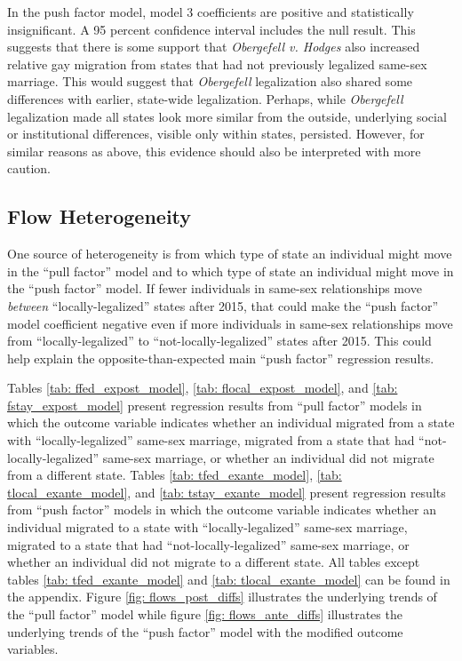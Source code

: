 \documentclass[12pt,letterpaper]{article}
\begin{document}
In the push factor model, model 3 coefficients are positive and statistically insignificant. A 95 percent confidence interval includes the null result. This suggests that there is some support that \textit{Obergefell v. Hodges} also increased relative gay migration from states that had not previously legalized same-sex marriage. This would suggest that \textit{Obergefell} legalization also shared some differences with earlier, state-wide legalization. Perhaps, while \textit{Obergefell} legalization made all states look more similar from the outside, underlying social or institutional differences, visible only within states, persisted. However, for similar reasons as above, this evidence should also be interpreted with more caution.


\clearpage
\subsection{Flow Heterogeneity}

One source of heterogeneity is from which type of state an individual might move in the “pull factor” model and to which type of state an individual might move in the “push factor” model. If fewer individuals in same-sex relationships move \textit{between} “locally-legalized” states after 2015, that could make the “push factor” model coefficient negative even if more individuals in same-sex relationships move from “locally-legalized” to “not-locally-legalized” states after 2015. This could help explain the opposite-than-expected main “push factor” regression results.

Tables \ref{tab: ffed_expost_model}, \ref{tab: flocal_expost_model}, and \ref{tab: fstay_expost_model} present regression results from “pull factor” models in which the outcome variable indicates whether an individual migrated from a state with “locally-legalized” same-sex marriage, migrated from a state that had “not-locally-legalized” same-sex marriage, or whether an individual did not migrate from a different state. Tables \ref{tab: tfed_exante_model}, \ref{tab: tlocal_exante_model}, and \ref{tab: tstay_exante_model} present regression results from “push factor” models in which the outcome variable indicates whether an individual migrated to a state with “locally-legalized” same-sex marriage, migrated to a state that had “not-locally-legalized” same-sex marriage, or whether an individual did not migrate to a different state. All tables except tables \ref{tab: tfed_exante_model} and \ref{tab: tlocal_exante_model} can be found in the appendix. Figure \ref{fig: flows_post_diffs} illustrates the underlying trends of the “pull factor” model while figure \ref{fig: flows_ante_diffs} illustrates the underlying trends of the “push factor” model with the modified outcome variables.
\end{document}
